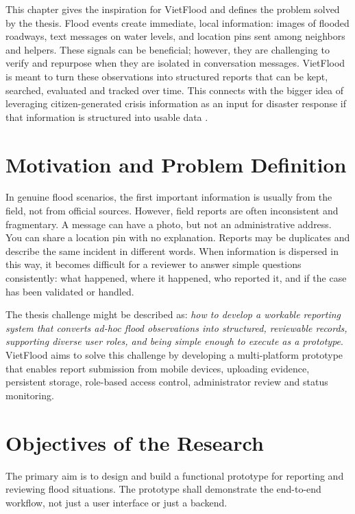 This chapter gives the inspiration for VietFlood and defines the problem solved by the thesis. Flood events create immediate, local information: images of flooded roadways, text messages on water levels, and location pins sent among neighbors and helpers. These signals can be beneficial; however, they are challenging to verify and repurpose when they are isolated in conversation messages. VietFlood is meant to turn these observations into structured reports that can be kept, searched, evaluated and tracked over time. This connects with the bigger idea of leveraging citizen-generated crisis information as an input for disaster response if that information is structured into usable data \cite{goodchild2010crowdsourcing,imran2015processing}.

\section{Motivation and Problem Definition}

In genuine flood scenarios, the first important information is usually from the field, not from official sources. However, field reports are often inconsistent and fragmentary. A message can have a photo, but not an administrative address. You can share a location pin with no explanation. Reports may be duplicates and describe the same incident in different words. When information is dispersed in this way, it becomes difficult for a reviewer to answer simple questions consistently: what happened, where it happened, who reported it, and if the case has been validated or handled.

The thesis challenge might be described as: \textit{how to develop a workable reporting system that converts ad-hoc flood observations into structured, reviewable records, supporting diverse user roles, and being simple enough to execute as a prototype}. VietFlood aims to solve this challenge by developing a multi-platform prototype that enables report submission from mobile devices, uploading evidence, persistent storage, role-based access control, administrator review and status monitoring.

\section{Objectives of the Research}

The primary aim is to design and build a functional prototype for reporting and reviewing flood situations. The prototype shall demonstrate the end-to-end workflow, not just a user interface or just a backend.

